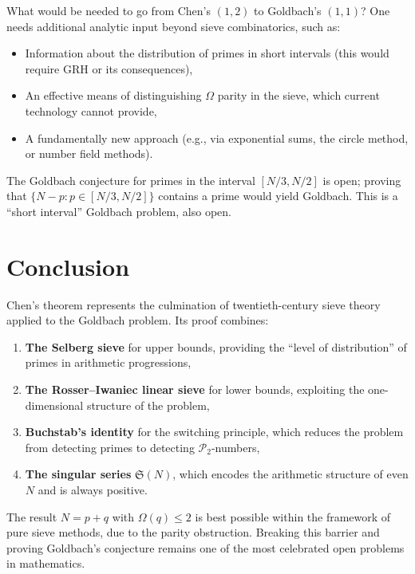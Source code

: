 \documentclass[12pt,a4paper]{amsart}
\theoremstyle{definition}
\newcommand{\Ptwo}{\mathcal{P}_2}
\newcommand{\OOmega}{\Omega}   %
\begin{document}
What would be needed to go from Chen's $(1,2)$ to Goldbach's $(1,1)$?
One needs additional analytic input beyond sieve combinatorics, such as:
\begin{itemize}
  \item Information about the distribution of primes in short intervals
    (this would require GRH or its consequences),
  \item An effective means of distinguishing $\OOmega$ parity in the
    sieve, which current technology cannot provide,
  \item A fundamentally new approach (e.g., via exponential sums, the
    circle method, or number field methods).
\end{itemize}

The Goldbach conjecture for primes in the interval $[N/3, N/2]$ is open;
proving that $\{N - p : p \in [N/3, N/2]\}$ contains a prime would yield
Goldbach.  This is a ``short interval'' Goldbach problem, also open.

\section{Conclusion}

Chen's theorem represents the culmination of twentieth-century sieve theory
applied to the Goldbach problem.  Its proof combines:
\begin{enumerate}
  \item \textbf{The Selberg sieve} for upper bounds, providing the
    ``level of distribution'' of primes in arithmetic progressions,
  \item \textbf{The Rosser--Iwaniec linear sieve} for lower bounds,
    exploiting the one-dimensional structure of the problem,
  \item \textbf{Buchstab's identity} for the switching principle, which
    reduces the problem from detecting primes to detecting $\Ptwo$-numbers,
  \item \textbf{The singular series} $\mathfrak{S}(N)$, which encodes the
    arithmetic structure of even $N$ and is always positive.
\end{enumerate}

The result $N = p + q$ with $\OOmega(q) \leq 2$ is best possible within
the framework of pure sieve methods, due to the parity obstruction.
Breaking this barrier and proving Goldbach's conjecture remains one of the
most celebrated open problems in mathematics.
\end{document}
